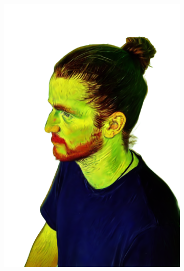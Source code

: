 \begin{figure}[ht]
	\centering
	\begin{subfigure}{0.2\linewidth}
		\includegraphics[width=\textwidth]{Figures/results/high/ephra_vangogh/23_render.png}

\end{subfigure}
\end{figure}
